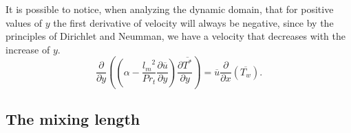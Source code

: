 \documentclass[10pt]{article} %
\begin{document}
It is possible to notice, when analyzing the dynamic domain, that for positive values of $ y $ the first derivative of velocity will always be negative, since by the principles of Dirichlet and Neumman, we have a velocity that decreases with the increase of $ y $.\\
\begin{equation}
{\frac{\partial{}}{\partial{y}}} \left( \left( \alpha   
- \frac{{l_m}^2}{Pr_t}\frac{\partial \overline{u}}{\partial y} \right) \frac{\partial \overline{T^\ast}}{\partial y} \right)
= 
\overline{u}\frac{\partial{}}{\partial{x}}\left(\overline{T_w}\right)  .
\end{equation}



\subsection{The mixing length}
\end{document}
